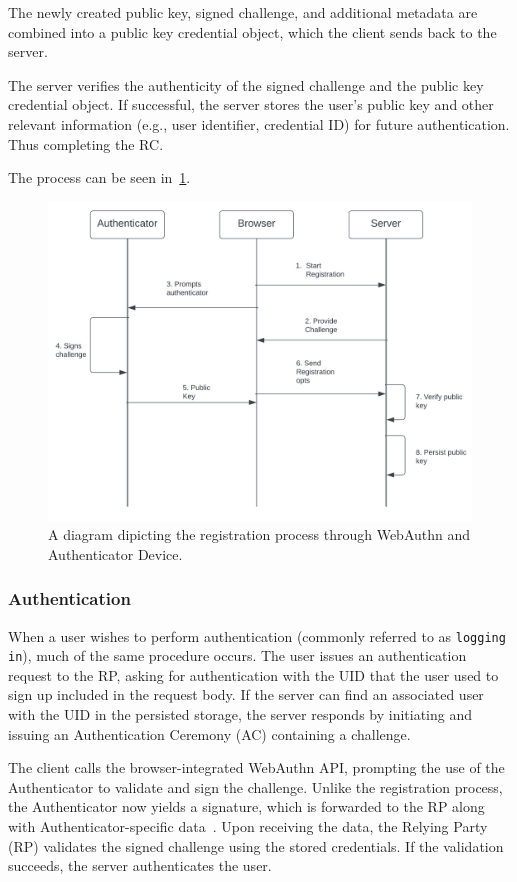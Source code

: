 The newly created public key, signed challenge, and additional metadata are combined into a public key credential object,
which the client sends back to the server.

The server verifies the authenticity of the signed challenge and the public key credential object.
If successful, the server stores the user's public key and other relevant information (e.g., user identifier, credential ID)
for future authentication.
Thus completing the RC\@.

The process can be seen in~\ref{fig:registration}.
\begin{figure}[htbp]
  \centering
  \includegraphics[width=0.75\linewidth]{images/Registration}
  \caption{\footnotesize A diagram dipicting the registration process through WebAuthn and Authenticator Device.}
  \label{fig:registration}
\end{figure}

\subsubsection{Authentication}\label{subsubsec:authentication}
When a user wishes to perform authentication (commonly referred to as \texttt{logging in}), much of the same procedure
occurs.
The user issues an authentication request to the RP, asking for authentication
with the UID that the user used to sign up included in the request body.
If the server can find an associated user with the UID in the persisted storage,
the server responds by initiating and issuing an Authentication Ceremony (AC)
containing a challenge.

The client calls the browser-integrated WebAuthn API, prompting the use of the
Authenticator to validate and sign the challenge.
Unlike the registration process, the Authenticator now yields a signature, which is forwarded to the RP along with
Authenticator-specific data~\cite{webauthn_authenticator_data}.
Upon receiving the data, the Relying Party (RP) validates the signed challenge using the stored credentials.
If the validation succeeds, the server authenticates the user.

